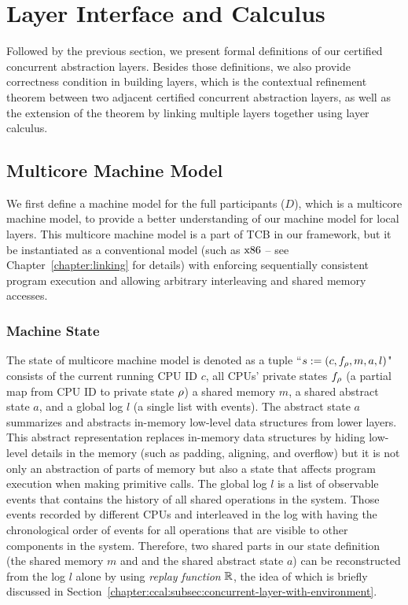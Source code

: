 \section{Layer Interface and Calculus}
\label{chapter:ccal:sec:interface-calculus}

Followed by the previous section, 
we present formal definitions of our certified concurrent abstraction layers.
Besides those definitions, 
we also provide correctness condition in building layers, which is 
the contextual refinement theorem between two adjacent certified concurrent abstraction layers,
as well as the extension of the theorem by linking multiple layers together using layer calculus.


\subsection{Multicore Machine Model}
\label{chapter:ccal:subsec:multicore-machine-model}


We first define a machine model for the full participants ($D$), which is a multicore machine model, 
to provide a better understanding of our machine model for local layers.
This multicore machine model is a part of TCB in our framework, but it be instantiated as a conventional model (such as $\mathrm{x86}$ -- see Chapter~\ref{chapter:linking} for  details) with enforcing sequentially consistent program
execution and allowing arbitrary interleaving
and shared memory accesses. 


\subsubsection{Machine State} 
The state of  multicore machine model is denoted as a tuple ``$s := (c, f_{\rho}, m, a, l)$"
consists of
 the current running CPU ID $c$,
all CPUs' private states $f_\rho$ (a partial map from CPU ID to  private state $\rho$)
 a shared memory $m$,
 a shared abstract state $a$,
and  a global log $l$ (a single list with events).
The abstract state $a$ 
summarizes and abstracts in-memory low-level data structures from lower layers. 
This abstract representation replaces
in-memory data structures by hiding low-level details in the memory (such as padding, aligning, and overflow)
but it is not only an abstraction of parts of memory but also a state that affects program execution when making primitive calls. 
The global log $l$ is a list of observable events that contains the history of all shared operations in the system.
Those events recorded by different CPUs and
interleaved in the log with having the chronological order of events for all operations that are visible to other components in the system. 
Therefore, 
two shared parts in our state definition (the shared memory $m$ and 
and the shared abstract state $a$)
can be reconstructed
from the log $l$ alone by using \emph{replay function} $\mathbb{R}$,
the idea of which is briefly discussed in Section~\ref{chapter:ccal:subsec:concurrent-layer-with-environment}.


